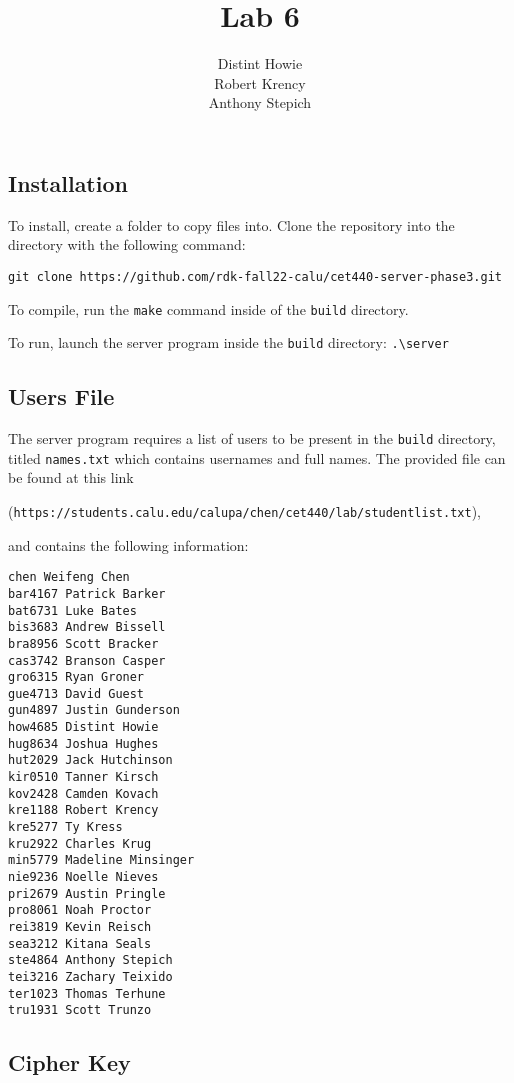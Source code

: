 \documentclass{article}
\date{}
\author{Distint Howie \\ Robert Krency \\ Anthony Stepich}
\title{Lab 6}
\newcommand{\code}[1]{\colorbox{codegray}{\texttt{#1}}}
\begin{document}
\maketitle

\pagebreak

\subsection*{Installation}

To install, create a folder to copy files into. Clone the repository into the directory with the following command: 

\code{git clone https://github.com/rdk-fall22-calu/cet440-server-phase3.git}

To compile, run the \code{make} command inside of the \code{build} directory.

To run, launch the server program inside the \code{build} directory: \code{.{\textbackslash}server}

\subsection*{Users File}

The server program requires a list of users to be present in the \code{build} directory, titled \code{names.txt} which contains usernames and full names.
The provided file can be found at this link 

(\code{https://students.calu.edu/calupa/chen/cet440/lab/studentlist.txt}), 

and contains the following information:

\begin{lstlisting}[style=CStyle]
chen Weifeng Chen
bar4167 Patrick Barker
bat6731 Luke Bates
bis3683 Andrew Bissell
bra8956 Scott Bracker
cas3742 Branson Casper
gro6315 Ryan Groner
gue4713 David Guest
gun4897 Justin Gunderson
how4685 Distint Howie
hug8634 Joshua Hughes
hut2029 Jack Hutchinson
kir0510 Tanner Kirsch
kov2428 Camden Kovach
kre1188 Robert Krency
kre5277 Ty Kress
kru2922 Charles Krug
min5779 Madeline Minsinger
nie9236 Noelle Nieves
pri2679 Austin Pringle
pro8061 Noah Proctor
rei3819 Kevin Reisch
sea3212 Kitana Seals
ste4864 Anthony Stepich
tei3216 Zachary Teixido
ter1023 Thomas Terhune
tru1931 Scott Trunzo
\end{lstlisting}

\subsection*{Cipher Key}
\end{document}
